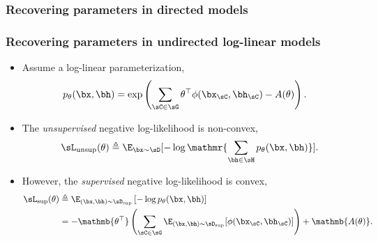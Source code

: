 \documentclass[xcolor={svgnames}]{beamer}
\begin{document}
\begin{frame}
  \frametitle{Recovering parameters in directed models}
\end{frame}

\begin{frame}
  \frametitle{Recovering parameters in undirected log-linear models}

    \begin{itemize}
      \item<1-> Assume a log-linear parameterization,
        \begin{align*}
          p_\theta(\bx, \bh) &= \exp\left( \sum_{\sC \in \sG} \theta^\top \phi(\bx_\sC,\bh_\sC) - A(\theta) \right).
        \end{align*}
      \item<2-> The {\em unsupervised} negative log-likelihood is non-convex,
          \begin{align*}
            \sL_\text{unsup}(\theta) \eqdef \E_{\bx \sim \sD}[- \log \mathmr{ \sum_{\bh \in \sH} p_\theta(\bx,\bh)} ].
          \end{align*}
      \item<3-> However, the {\em supervised} negative log-likelihood is convex,
          \begin{align*}
          \sL_\text{sup}(\theta) &\eqdef \E_{(\bx,\bh) \sim \sD_\text{sup}}\left[- \log p_\theta(\bx,\bh) \right] \\
          &= -\mathmb{\theta^\top} \left(\sum_{\sC \in \sG} \E_{(\bx,\bh) \sim \sD_\text{sup}}[\phi(\bx_\sC,\bh_\sC)]\right) + \mathmb{A(\theta)}.
          \end{align*}
    \end{itemize}
\end{frame}
\end{document}
